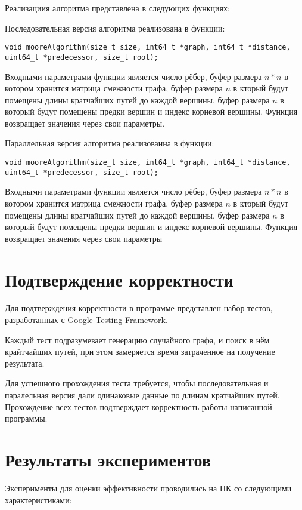 \documentclass{report}
\begin{document}
\par Реализациия алгоритма представлена в следующих функциях:
\par Последовательная версия алгоритма реализована в функции:
\begin{lstlisting}
void mooreAlgorithm(size_t size, int64_t *graph, int64_t *distance, uint64_t *predecessor, size_t root);
\end{lstlisting}
\par Входными параметрами функции является число рёбер, буфер размера $n*n$ в котором хранится матрица смежности графа, буфер размера $n$ в кторый будут помещены длины кратчайших путей до каждой вершины, буфер размера $n$ в который будут помещены предки вершин и индекс корневой вершины. Функция возвращает значения через свои параметры.
\par Параллельная версия алгоритма реализованна в функции:
\begin{lstlisting}
void mooreAlgorithm(size_t size, int64_t *graph, int64_t *distance, uint64_t *predecessor, size_t root);
\end{lstlisting}
\par Входными параметрами функции является число рёбер, буфер размера $n*n$ в котором хранится матрица смежности графа, буфер размера $n$ в кторый будут помещены длины кратчайших путей до каждой вершины, буфер размера $n$ в который будут помещены предки вершин и индекс корневой вершины. Функция возвращает значения через свои параметры

\newpage

\section*{Подтверждение корректности}
Для подтверждения корректности в программе представлен набор тестов, разработанных с Google Testing Framework.
\par Каждый тест подразумевает генерацию случайного графа, и поиск в нём крайтчайших путей, при этом замеряется время затраченное на получение результата.
\par Для успешного прохождения теста требуется, чтобы последовательная и паралельная версия дали одинаковые данные по длинам кратчайших путей. Прохождение всех тестов подтверждает корректность работы написанной программы.
\newpage

\section*{Результаты экспериментов}
Эксперименты для оценки эффективности проводились на ПК со следующими характеристиками:
\end{document}
